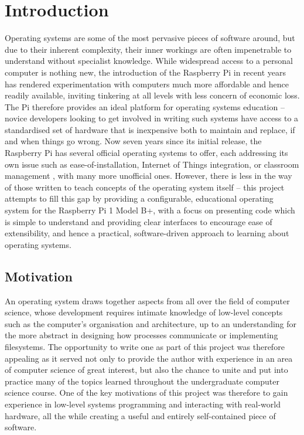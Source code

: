 \section{Introduction}
    Operating systems are some of the most pervasive pieces of software around,
    but due to their inherent complexity, their inner workings are often
    impenetrable to understand without specialist knowledge. While widespread
    access to a personal computer is nothing new, the introduction of the
    Raspberry Pi in recent years has rendered experimentation with computers
    much more affordable and hence readily available, inviting tinkering at all
    levels with less concern of economic loss. The Pi therefore provides an
    ideal platform for operating systems education -- novice developers looking
    to get involved in writing such systems have access to a standardised set of
    hardware that is inexpensive both to maintain and replace, if and when
    things go wrong. Now seven years since its initial release, the Raspberry
    Pi has several official operating systems to offer, each addressing its own
    issue such as ease-of-installation, Internet of Things integration, or
    classroom management \cite{OSes}, with many more unofficial ones. However,
    there is less in the way of those written to teach concepts of the operating
    system itself -- this project attempts to fill this gap by providing a
    configurable, educational operating system for the Raspberry Pi 1 Model B+,
    with a focus on presenting code which is simple to understand and providing
    clear interfaces to encourage ease of extensibility, and hence a practical,
    software-driven approach to learning about operating systems.

\subsection{Motivation}
    An operating system draws together aspects from all over the field of
    computer science, whose development requires intimate knowledge of low-level
    concepts such as the computer's organisation and architecture, up to an
    understanding for the more abstract in designing how processes communicate
    or implementing filesystems. The opportunity to write one as part of this
    project was therefore appealing as it served not only to provide the author
    with experience in an area of computer science of great interest,
    but also the chance to unite and put into practice many of the topics
    learned throughout the undergraduate computer science course. One of the key
    motivations of this project was therefore to gain experience in low-level
    systems programming and interacting with real-world hardware, all the while
    creating a useful and entirely self-contained piece of software.

